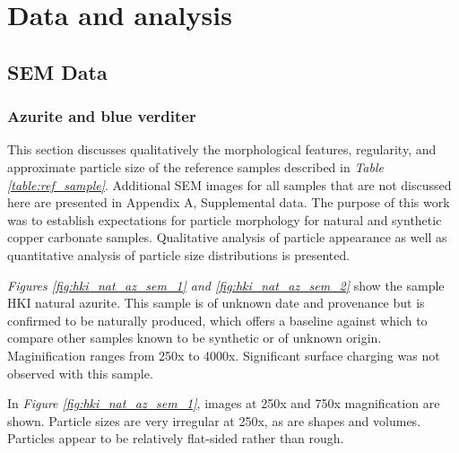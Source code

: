\chapter{Data and analysis}

\ifpdf
    \graphicspath{{Chapter3/Figs/Raster/}{Chapter3/Figs/PDF/}{Chapter3/Figs/}}
\else
    \graphicspath{{Chapter3/Figs/Vector/}{Chapter3/Figs/}}
\fi

\section[SEM Data]{SEM Data}
\label{section3.1}

\subsection[Azurite and blue verditer]{Azurite and blue verditer}
\label{subsection3.1.1}

This section discusses qualitatively the morphological features, regularity, and approximate particle size of the reference samples described in \textit{Table \ref{table:ref_sample}}. Additional SEM images for all samples that are not discussed here are presented in Appendix A, Supplemental data. The purpose of this work was to establish expectations for particle morphology for natural and synthetic copper carbonate samples. Qualitative analysis of particle appearance as well as quantitative analysis of particle size distributions is presented.



\textit{Figures \ref{fig:hki_nat_az_sem_1} and \ref{fig:hki_nat_az_sem_2}} show the sample HKI natural azurite. This sample is of unknown date and provenance but is confirmed to be naturally produced, which offers a baseline against which to compare other samples known to be synthetic or of unknown origin. Maginification ranges from 250x to 4000x. Significant surface charging was not observed with this sample.

In \textit{Figure \ref{fig:hki_nat_az_sem_1}}, images at 250x and 750x magnification are shown. Particle sizes are very irregular at 250x, as are shapes and volumes. Particles appear to be relatively flat-sided rather than rough. 


